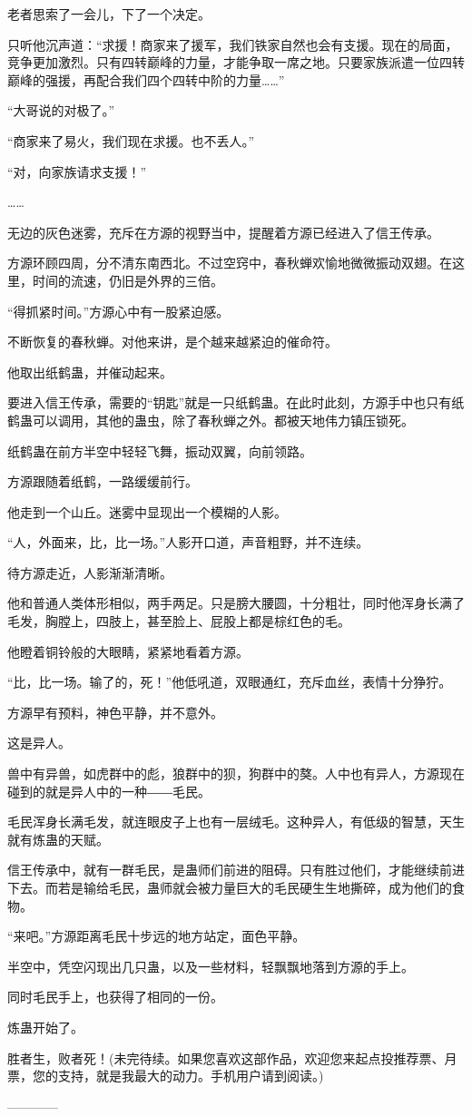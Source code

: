 \begin{this_body}
老者思索了一会儿，下了一个决定。

只听他沉声道：“求援！商家来了援军，我们铁家自然也会有支援。现在的局面，竞争更加激烈。只有四转巅峰的力量，才能争取一席之地。只要家族派遣一位四转巅峰的强援，再配合我们四个四转中阶的力量……”

“大哥说的对极了。”

“商家来了易火，我们现在求援。也不丢人。”

“对，向家族请求支援！”

……

无边的灰色迷雾，充斥在方源的视野当中，提醒着方源已经进入了信王传承。

方源环顾四周，分不清东南西北。不过空窍中，春秋蝉欢愉地微微振动双翅。在这里，时间的流速，仍旧是外界的三倍。

“得抓紧时间。”方源心中有一股紧迫感。

不断恢复的春秋蝉。对他来讲，是个越来越紧迫的催命符。

他取出纸鹤蛊，并催动起来。

要进入信王传承，需要的“钥匙”就是一只纸鹤蛊。在此时此刻，方源手中也只有纸鹤蛊可以调用，其他的蛊虫，除了春秋蝉之外。都被天地伟力镇压锁死。

纸鹤蛊在前方半空中轻轻飞舞，振动双翼，向前领路。

方源跟随着纸鹤，一路缓缓前行。

他走到一个山丘。迷雾中显现出一个模糊的人影。

“人，外面来，比，比一场。”人影开口道，声音粗野，并不连续。

待方源走近，人影渐渐清晰。

他和普通人类体形相似，两手两足。只是膀大腰圆，十分粗壮，同时他浑身长满了毛发，胸膛上，四肢上，甚至脸上、屁股上都是棕红色的毛。

他瞪着铜铃般的大眼睛，紧紧地看着方源。

“比，比一场。输了的，死！”他低吼道，双眼通红，充斥血丝，表情十分狰狞。

方源早有预料，神色平静，并不意外。

这是异人。

兽中有异兽，如虎群中的彪，狼群中的狈，狗群中的獒。人中也有异人，方源现在碰到的就是异人中的一种――毛民。

毛民浑身长满毛发，就连眼皮子上也有一层绒毛。这种异人，有低级的智慧，天生就有炼蛊的天赋。

信王传承中，就有一群毛民，是蛊师们前进的阻碍。只有胜过他们，才能继续前进下去。而若是输给毛民，蛊师就会被力量巨大的毛民硬生生地撕碎，成为他们的食物。

“来吧。”方源距离毛民十步远的地方站定，面色平静。

半空中，凭空闪现出几只蛊，以及一些材料，轻飘飘地落到方源的手上。

同时毛民手上，也获得了相同的一份。

炼蛊开始了。

胜者生，败者死！(未完待续。如果您喜欢这部作品，欢迎您来起点投推荐票、月票，您的支持，就是我最大的动力。手机用户请到阅读。)

------------

\end{this_body}

